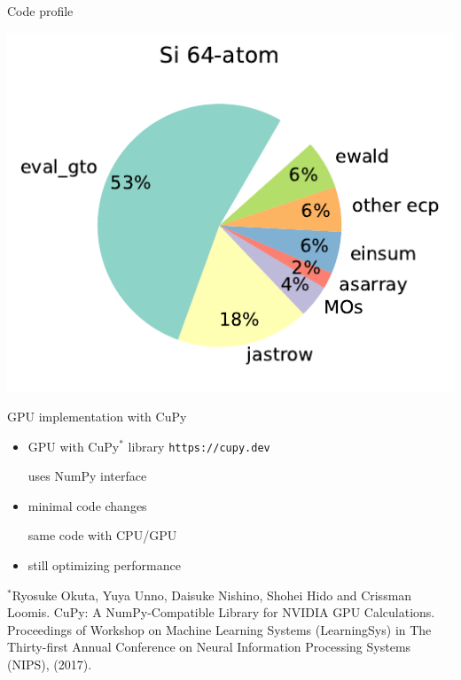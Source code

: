 \begin{frame}{Code profile}
\begin{minipage}{.45\textwidth}
\includegraphics[height=.45\textheight]{figures/profile_Si2.pdf}
\end{minipage}
\end{frame}






\begin{frame}{GPU implementation with CuPy}

\vspace{1em}

\begin{minipage}{0.93\textwidth}
\begin{itemize}[leftmargin=0em, itemsep=1em]
\item GPU with CuPy$^*$ library \texttt{https://cupy.dev}

\quad  uses NumPy interface 
\item minimal code changes 

\quad same code with CPU/GPU
\item still optimizing performance
\end{itemize}

\vspace{1em}
\parbox{\textwidth}{\tiny $^*$Ryosuke Okuta, Yuya Unno, Daisuke Nishino, Shohei Hido and Crissman Loomis. CuPy: A NumPy-Compatible Library for NVIDIA GPU Calculations. Proceedings of Workshop on Machine Learning Systems (LearningSys) in The Thirty-first Annual Conference on Neural Information Processing Systems (NIPS), (2017).}
\end{minipage}

\end{frame}

